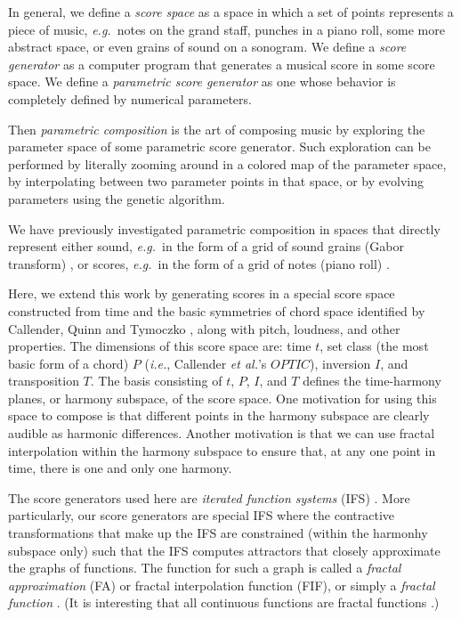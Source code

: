 \documentclass[english,11pt,letterpaper,onecolumn]{scrartcl}
\numberwithin{equation}{section}
\begin{document}
In general, we define a \textit{score space} as a space in which a set of points
represents a piece of music, \textit{e.g.}\ notes on the grand staff, punches in
a piano roll, some more abstract space, or even grains of sound on a sonogram.
We define a \textit{score generator} as a computer program that generates a
musical score in some score space. We define a \textit{parametric score
generator} as one whose behavior is completely defined by numerical parameters.

Then \textit{parametric composition} is the art of composing music by exploring
the parameter space of some parametric score generator. Such exploration can be
performed by literally zooming around in a colored map of the parameter space,
by interpolating between two parameter points in that space, or by evolving
parameters using the genetic algorithm.

We have previously investigated parametric composition in spaces that directly
represent either sound, \textit{e.g.}\ in the form of a grid of sound grains
(Gabor transform) \cite{obsessed}, or scores, \textit{e.g.}\ in the form of a
grid of notes (piano roll) \cite{ifsmusic}.

Here, we extend this work by generating scores in a special score space
constructed from time and the basic symmetries of chord space identified by
Callender, Quinn and Tymoczko \cite{callender:346}, along with pitch, loudness,
and other properties. The dimensions of this score space are: time $t$, set
class (the most basic form of a chord) $P$ (\textit{i.e.}, Callender \textit{et
al.}'s $OPTIC$), inversion $I$, and transposition $T$. The basis consisting of
$t$, $P$, $I$, and $T$ defines the time-harmony planes, or harmony subspace,
of the score space. One motivation for using this space to compose is that
different points in the harmony subspace are clearly audible as harmonic
differences. Another motivation is that we can use fractal interpolation within
the harmony subspace to ensure that, at any one point in time, there is one and
only one harmony.

The score generators used here are \textit{iterated function systems} (IFS)
\cite{barnsley1985iterated, 10.2307/24893080, fractalseverywhere}. More
particularly, our score generators are special IFS where the contractive
transformations that make up the IFS are constrained (within the harmonhy
subspace only) such that the IFS computes attractors that closely approximate
the graphs of functions. The function for such a graph is called a
\textit{fractal approximation} (FA) or fractal interpolation function (FIF), or
simply a \textit{fractal function} \cite{Barnsley1986, fractalseverywhere,
navascues2014fractal}. (It is interesting that all continuous functions are
fractal functions \cite{2016arXiv161001369B}.)
\end{document}
